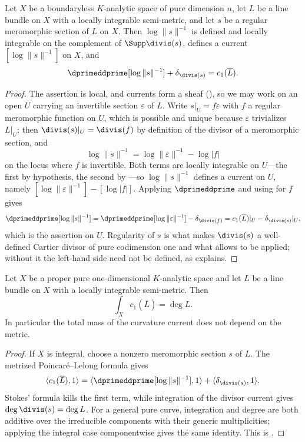 \begin{theorem}
\label{thm:ch17-pl-metrized}
Let $X$ be a boundaryless $K$-analytic space of pure dimension $n$,
let $L$ be a line bundle on $X$ with a locally integrable semi-metric,
and let $s$ be a regular meromorphic section of $L$ on $X$.  Then
$\log\|s\|^{-1}$ is defined and locally integrable on the complement of
$\Supp\divis(s)$, defines a current $[\log\|s\|^{-1}]$ on $X$, and
\[
 \dprimeddprime[\log\|s\|^{-1}]+\delta_{\divis(s)}=c_1(\overline L).
\]
\end{theorem}

\begin{proof}
The assertion is local, and currents form a sheaf
(), so we may work on an open $U$ carrying
an invertible section $\varepsilon$ of $L$.  Write $s|_U=f\varepsilon$
with $f$ a regular meromorphic function on $U$, which is possible and
unique because $\varepsilon$ trivializes $L|_U$; then
$\divis(s)|_U=\divis(f)$ by definition of the divisor of a meromorphic
section, and
\[
 \log\|s\|^{-1}=\log\|\varepsilon\|^{-1}-\log|f|
\]
on the locus where $f$ is invertible.  Both terms are locally integrable
on $U$---the first by hypothesis, the second by
---so $\log\|s\|^{-1}$ defines a current on
$U$, namely $[\log\|\varepsilon\|^{-1}]-[\log|f|]$.  Applying
$\dprimeddprime$ and using  for $f$ gives
\[
 \dprimeddprime[\log\|s\|^{-1}]
 =\dprimeddprime[\log\|\varepsilon\|^{-1}]-\delta_{\divis(f)}
 =c_1(\overline L)|_U-\delta_{\divis(s)}|_U,
\]
which is the assertion on $U$.  Regularity of $s$ is what makes
$\divis(s)$ a well-defined Cartier divisor of pure codimension one and
what allows  to be applied; without it the
left-hand side need not be defined, as  explains.
\end{proof}

\begin{corollary}
\label{cor:ch17-curve-total-mass}
Let $X$ be a proper pure one-dimensional $K$-analytic space and let $L$ be a line bundle on
$X$ with a locally integrable semi-metric.  Then
\[
 \int_{X}c_1(\overline L)=\deg L.
\]
In particular the total mass of the curvature current does not depend on the
metric.
\end{corollary}

\begin{proof}
If $X$ is integral, choose a nonzero meromorphic section $s$ of $L$.
The metrized Poincar\'e--Lelong formula gives
\[
 \langle c_1(\overline L),1\rangle
 =\langle\dprimeddprime[\log\|s\|^{-1}],1\rangle
  +\langle\delta_{\divis(s)},1\rangle.
\]
Stokes' formula kills the first term, while integration of the divisor
current gives $\deg\divis(s)=\deg L$.  For a general pure curve, integration
and degree are both additive over the irreducible components with their
generic multiplicities; applying the integral case componentwise gives the
same identity.  This is \cite[Corollary~18.1.7]{CLD25}.
\end{proof}

